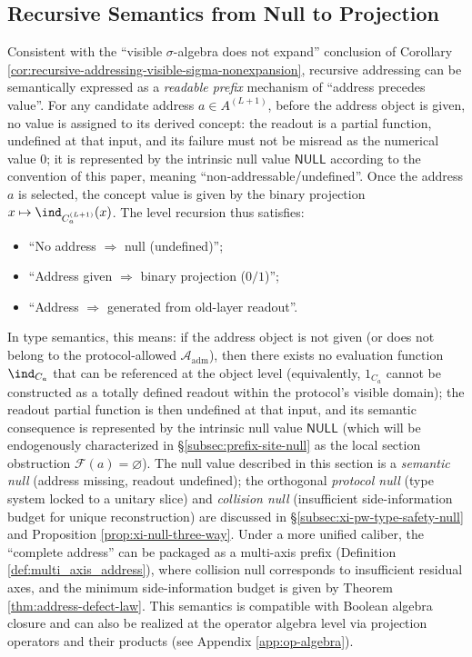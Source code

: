 \subsection{Recursive Semantics from Null to Projection}

Consistent with the ``visible \texorpdfstring{$\sigma$}{sigma}-algebra does not expand'' conclusion of Corollary \ref{cor:recursive-addressing-visible-sigma-nonexpansion}, recursive addressing can be semantically expressed as a \emph{readable prefix} mechanism of ``address precedes value''. For any candidate address \(a\in A^{(L+1)}\), before the address object is given, no value is assigned to its derived concept: the readout is a partial function, undefined at that input, and its failure must not be misread as the numerical value \(0\); it is represented by the intrinsic null value \(\mathsf{NULL}\) according to the convention of this paper, meaning ``non-addressable/undefined''. Once the address \(a\) is selected, the concept value is given by the binary projection \(x\mapsto \ind_{C_a^{(L+1)}}(x)\). The level recursion thus satisfies:
\begin{itemize}
  \item ``No address $\Rightarrow$ null (undefined)'';
  \item ``Address given $\Rightarrow$ binary projection ($0/1$)'';
  \item ``Address $\Rightarrow$ generated from old-layer readout''.
\end{itemize}
In type semantics, this means: if the address object is not given (or does not belong to the protocol-allowed \(\mathcal{A}_{\mathrm{adm}}\)), then there exists no evaluation function \(\ind_{C_a}\) that can be referenced at the object level (equivalently, \(1_{C_a}\) cannot be constructed as a totally defined readout within the protocol's visible domain);
the readout partial function is then undefined at that input, and its semantic consequence is represented by the intrinsic null value \(\mathsf{NULL}\) (which will be endogenously characterized in \S\ref{subsec:prefix-site-null} as the local section obstruction \(\mathscr{F}(a)=\varnothing\)).
The null value described in this section is a \emph{semantic null} (address missing, readout undefined); the orthogonal \emph{protocol null} (type system locked to a unitary slice) and \emph{collision null} (insufficient side-information budget for unique reconstruction) are discussed in \S\ref{subsec:xi-pw-type-safety-null} and Proposition \ref{prop:xi-null-three-way}. Under a more unified caliber, the ``complete address'' can be packaged as a multi-axis prefix (Definition \ref{def:multi_axis_address}), where collision null corresponds to insufficient residual axes, and the minimum side-information budget is given by Theorem \ref{thm:address-defect-law}.
This semantics is compatible with Boolean algebra closure and can also be realized at the operator algebra level via projection operators and their products (see Appendix \ref{app:op-algebra}).

